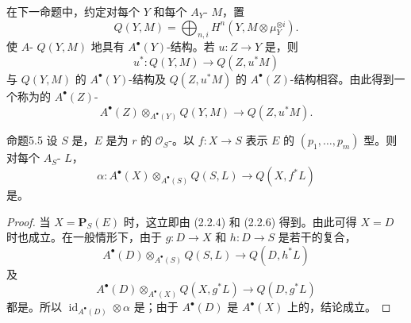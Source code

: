 在下一命题中，约定对每个 $Y$ 和每个 $A_Y$- $M$，置
\[
 Q(Y,M)=\bigoplus_{n,i}H^n(Y,M\otimes\mu_Y^{\otimes i}).
\]
使 $A$- $Q(Y,M)$ 地具有 $A^\bullet(Y)$-结构。若 $u:Z\to Y$ 是，则
\[
 u^*:Q(Y,M)\longrightarrow Q(Z,u^*M)
\]
与 $Q(Y,M)$ 的 $A^\bullet(Y)$-结构及 $Q(Z,u^*M)$ 的 $A^\bullet(Z)$-结构相容。由此得到一个称为的 $A^\bullet(Z)$-
\[
 A^\bullet(Z)\otimes_{A^\bullet(Y)}Q(Y,M)\longrightarrow Q(Z,u^*M).
\]
\begin{SGAresult}{命题}{5.5}
设 $S$ 是，$E$ 是为 $r$ 的 $\mathscr O_S$-。以 $f:X\to S$ 表示 $E$ 的 $(p_1,\ldots,p_m)$ 型。则对每个 $A_S$- $L$，
\[
 \alpha:A^\bullet(X)\otimes_{A^\bullet(S)}Q(S,L)\longrightarrow Q(X,f^*L)
\]
是。
\end{SGAresult}
\begin{proof}
当 $X=\mathbf P_S(E)$ 时，这立即由 (2.2.4) 和 (2.2.6) 得到。由此可得 $X=D$ 时也成立。在一般情形下，由于 $g:D\to X$ 和 $h:D\to S$ 是若干的复合，
\[
 A^\bullet(D)\otimes_{A^\bullet(S)}Q(S,L)\longrightarrow Q(D,h^*L)
\]
及
\[
 A^\bullet(D)\otimes_{A^\bullet(X)}Q(X,g^*L)\longrightarrow Q(D,g^*L)
\]
都是。所以 $\operatorname{id}_{A^\bullet(D)}\otimes\alpha$ 是；由于 $A^\bullet(D)$ 是 $A^\bullet(X)$ 上的，结论成立。
\end{proof}

